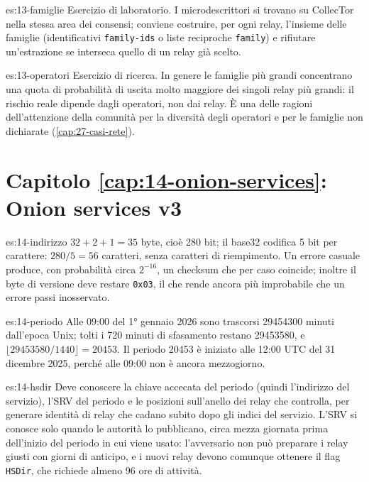 \begin{soluzione}{es:13-famiglie}
Esercizio di laboratorio. I microdescrittori si trovano su CollecTor nella stessa area dei consensi; conviene costruire, per ogni relay, l'insieme delle famiglie (identificativi \texttt{family-ids} o liste reciproche \texttt{family}) e rifiutare un'estrazione se interseca quello di un relay già scelto.
\end{soluzione}

\begin{soluzione}{es:13-operatori}
Esercizio di ricerca. In genere le famiglie più grandi concentrano una quota di probabilità di uscita molto maggiore dei singoli relay più grandi: il rischio reale dipende dagli operatori, non dai relay. È una delle ragioni dell'attenzione della comunità per la diversità degli operatori e per le famiglie non dichiarate (\cref{cap:27-casi-rete}).
\end{soluzione}

\section*{Capitolo \ref{cap:14-onion-services}: Onion services v3}

\begin{soluzione}{es:14-indirizzo}
$32 + 2 + 1 = 35$ byte, cioè 280 bit; il base32 codifica 5 bit per carattere: $280/5 = 56$ caratteri, senza caratteri di riempimento. Un errore casuale produce, con probabilità circa $2^{-16}$, un checksum che per caso coincide; inoltre il byte di versione deve restare \texttt{0x03}, il che rende ancora più improbabile che un errore passi inosservato.
\end{soluzione}

\begin{soluzione}{es:14-periodo}
Alle 09:00 del 1° gennaio 2026 sono trascorsi \num{29454300} minuti dall'epoca Unix; tolti i 720 minuti di sfasamento restano \num{29453580}, e $\lfloor 29453580 / 1440 \rfloor = 20453$. Il periodo \num{20453} è iniziato alle 12:00 UTC del 31 dicembre 2025, perché alle 09:00 non è ancora mezzogiorno.
\end{soluzione}

\begin{soluzione}{es:14-hsdir}
Deve conoscere la chiave accecata del periodo (quindi l'indirizzo del servizio), l'SRV del periodo e le posizioni sull'anello dei relay che controlla, per generare identità di relay che cadano subito dopo gli indici del servizio. L'SRV si conosce solo quando le autorità lo pubblicano, circa mezza giornata prima dell'inizio del periodo in cui viene usato: l'avversario non può preparare i relay giusti con giorni di anticipo, e i nuovi relay devono comunque ottenere il flag \texttt{HSDir}, che richiede almeno 96 ore di attività.
\end{soluzione}

